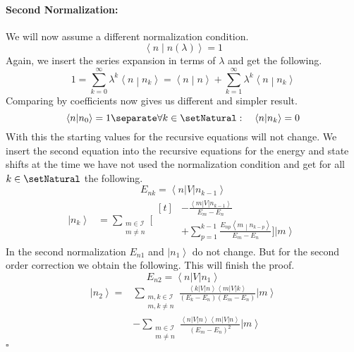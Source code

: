 \documentclass[10pt,fleqn]{article}
\newcommand{\bra}[1]{\left\langle #1 \right\vert}
\newcommand{\ket}[1]{\left\vert #1 \right\rangle}
\newcommand{\bracket}[2]{\left\langle #1 \middle\vert #2 \right\rangle}
\begin{document}
\begin{multicols}{2}
      \paragraph{Second Normalization:}
      We will now assume a different normalization condition.
      \[
        \bracket{n}{n(λ)} = 1
      \]
      Again, we insert the series expansion in terms of $λ$ and get the following.
      \[
        1 = \sum_{k=0}^\infty λ^k \bracket{n}{n_k} = \bracket{n}{n} + \sum_{k=1}^\infty λ^k \bracket{n}{n_k}
      \]
      Comparing by coefficients now gives us different and simpler result.
      \[
        \bracket{n}{n_0} = 1
        \separate
        \forall k\in\setNatural:\quad \bracket{n}{n_k} = 0
      \]
      With this the starting values for the recursive equations will not change.
      We insert the second equation into the recursive equations for the energy and state shifts at the time we have not used the normalization condition and get for all $k\in\setNatural$ the following.
      \[
        E_{nk} = \bra{n}V\ket{n_{k-1}}
      \]
      \[
        \begin{aligned}
          \ket{n_k} &= \sum_{\substack{m\in\mathscr{I}\\m\neq n}} \bigg[
            \begin{aligned}[t]
              & -\frac{\bra{m}V\ket{n_{k-1}}}{E_m-E_n} \\
              & + \sum_{p=1}^{k-1} \frac{E_{np}\bracket{m}{n_{k-p}}}{E_m - E_n} \bigg] \ket{m}
            \end{aligned}
        \end{aligned}
      \]
      In the second normalization $E_{n1}$ and $\ket{n_1}$ do not change.
      But for the second order correction we obtain the following.
      This will finish the proof.
      \[
        E_{n2} = \bra{n}V\ket{n_1}
      \]
      \[
        \begin{aligned}
          \ket{n_2}
          = &\sum_{\substack{m,k\in\mathscr{I}\\m,k\neq n}} \frac{\bra{k}V\ket{n} \bra{m}V\ket{k}}{(E_k-E_n)(E_m-E_n)} \ket{m} \\
          &- \sum_{\substack{m\in\mathscr{I}\\m\neq n}} \frac{\bra{n}V\ket{n} \bra{m}V\ket{n}}{(E_m-E_n)^2} \ket{m}
        \end{aligned}
      \]
      \hfill $\square$
    \end{multicols}

  \newpage
\end{document}
